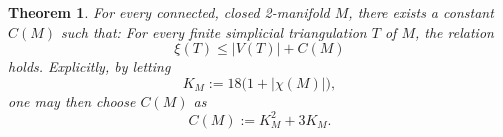 \documentclass[10pt,a4paper]{amsart}
\newtheorem{theorem}{Theorem}
\begin{document}
\begin{theorem}\label{firstsolution}
 For every connected, closed 2-manifold $M$, 
 there exists a constant $C(M)$ such that: For every finite simplicial triangulation $T$ of $M$, 
 the relation 
\begin{equation}\label{equivalentconj}
 \xi(T) \leq \left| V(T) \right| + C(M) 
\end{equation}
 holds. Explicitly, by letting 
 \begin{equation}\label{defineKM}
 K_{M} := 18 \big( 1 + |\chi(M)| \big), 
\end{equation}
 one may then choose $C(M)$ as 
\begin{equation}\label{defineCM} 
 C(M) := K_{M}^{2} + 3 K_{M}. 
\end{equation} 
\end{theorem}
\end{document}

